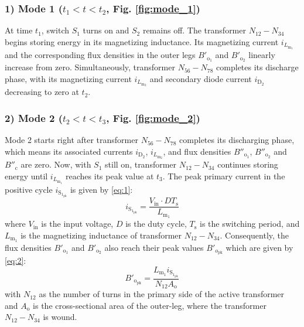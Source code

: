 \documentclass[lettersize,journal]{IEEEtran}
\begin{document}
\subsubsection*{\textup{1) Mode 1 ($t_1 < t < t_2$, \textup{Fig. \ref{fig:mode_1}})}}
At time $t_1$, switch $S_1$ turns on and $S_2$ remains off. The transformer $N_{12}-N_{34}$ begins storing energy in its magnetizing inductance. Its magnetizing current $i_{L_{\mathrm{m}_1}}$ and the corresponding flux densities in the outer legs $B'_{\mathrm{o}_1}$ and $B'_{\mathrm{o}_2}$ linearly increase from zero. Simultaneously, transformer $N_{56}-N_{78}$ completes its discharge phase, with its magnetizing current $i_{L_{\mathrm{m}_2}}$ and secondary diode current $i_{\mathrm{D}_2}$ decreasing to zero at $t_2$.

\subsubsection*{\textup{2) Mode 2 ($t_2 < t < t_3$, \textup{Fig. \ref{fig:mode_2}})}}
Mode 2 starts right after transformer $N_{56}-N_{78}$ completes its discharging phase, which means its associated currents $i_{\mathrm{D}_2}$, $i_{L_{\mathrm{m}_2}}$, and flux densities $B''_{\mathrm{o}_1}$, $B''_{\mathrm{o}_2}$ and $B''_{\mathrm{c}}$ are zero. Now, with $S_1$ still on, transformer $N_{12}-N_{34}$ continues storing energy until $i_{L_{\mathrm{m}_1}}$ reaches its peak value at $t_3$. The peak primary current in the positive cycle $i_{\mathrm{S}_{1_{\mathrm{pk}}}}$ is given by \eqref{eq:1}:
\begin{equation}
\label{eq:1}
i_{\mathrm{S}_{1_{\mathrm{pk}}}} = \frac{V_{\mathrm{in}} \cdot DT_{\mathrm{s}}}{L_{\mathrm{m}_1}}
\end{equation}
where $V_{\mathrm{in}}$ is the input voltage, $D$ is the duty cycle, $T_{\mathrm{s}}$ is the switching period, and $L_{\mathrm{m}_1}$ is the magnetizing inductance of transformer $N_{12}-N_{34}$. Consequently, the flux densities $B'_{\mathrm{o}_1}$ and $B'_{\mathrm{o}_2}$ also reach their peak values $B'_{o_{\mathrm{pk}}}$ which are given by \eqref{eq:2}:
\begin{equation}
\label{eq:2}
B'_{\mathrm{o}_{\mathrm{pk}}} = \frac{L_{\mathrm{m}_1} i_{\mathrm{S}_{1_{\mathrm{pk}}}}}{N_{12} A_{\mathrm{o}}}
\end{equation}
with $N_{12}$ as the number of turns in the primary side of the active transformer and $A_{\mathrm{o}}$ is the cross-sectional area of the outer-leg, where the transformer $N_{12}-N_{34}$ is wound.
\end{document}
